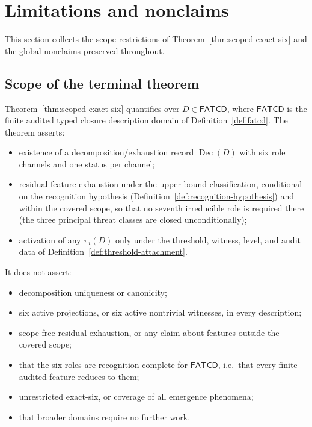 \documentclass[11pt]{article}
\theoremstyle{definition}
\newcommand{\FATCD}{\ensuremath{\mathsf{FATCD}}}
\newcommand{\Dec}[1]{\ensuremath{\operatorname{Dec}\!\left(#1\right)}}
\begin{document}
 \section{Limitations and nonclaims}\label{sec:limitations-nonclaims}



This section collects the scope restrictions of
Theorem~\ref{thm:scoped-exact-six} and the global nonclaims
preserved throughout.

\subsection{Scope of the terminal theorem}\label{subsec:terminal-scope}

Theorem~\ref{thm:scoped-exact-six} quantifies over \(D \in \FATCD{}\),
where \FATCD{} is the finite audited typed closure description domain
of Definition~\ref{def:fatcd}. The theorem asserts:
\begin{itemize}[topsep=2pt,itemsep=1pt]
  \item existence of a decomposition/exhaustion record \(\Dec{D}\)
    with six role channels and one status per channel;
  \item residual-feature exhaustion under the upper-bound classification,
    conditional on the recognition hypothesis
    (Definition~\ref{def:recognition-hypothesis}) and within the covered scope,
    so that no seventh irreducible role is required there (the three principal
    threat classes are closed unconditionally);
  \item activation of any \(\pi_i(D)\) only under the threshold,
    witness, level, and audit data of
    Definition~\ref{def:threshold-attachment}.
\end{itemize}

It does not assert:
\begin{itemize}[topsep=2pt,itemsep=1pt]
  \item decomposition uniqueness or canonicity;
  \item six active projections, or six active nontrivial witnesses, in
    every description;
  \item scope-free residual exhaustion, or any claim about features
    outside the covered scope;
  \item that the six roles are recognition-complete for \FATCD{}, i.e.\ that
    every finite audited feature reduces to them;
  \item unrestricted exact-six, or coverage of all emergence
    phenomena;
  \item that broader domains require no further work.
\end{itemize}
\end{document}
